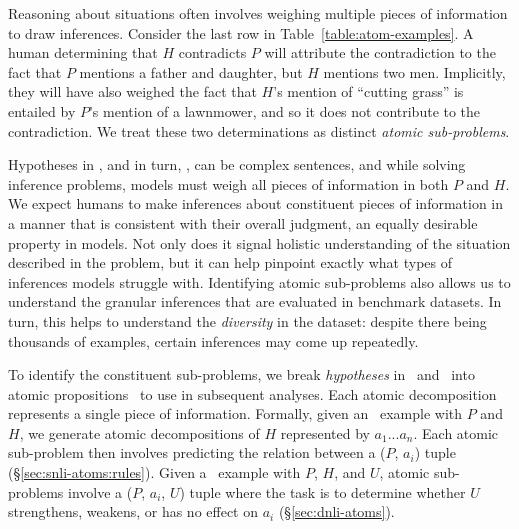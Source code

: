 

Reasoning about situations often involves weighing multiple pieces of information to draw inferences. 
%
Consider the last row in Table~\ref{table:atom-examples}. 
%
A human determining that $H$ contradicts $P$ will attribute the contradiction to the fact that $P$ mentions a father and daughter, but $H$ mentions two men.
%
Implicitly, they will have also weighed the fact that $H$'s mention of ``cutting grass'' is entailed by $P$'s mention of a lawnmower, and so it does not contribute to the contradiction.
%
We treat these two determinations as distinct \textit{atomic sub-problems}.


Hypotheses in \snli, and in turn, \dsnli, can be complex sentences, and while solving inference problems, models must weigh all pieces of information in both $P$ and $H$.
% 
We expect humans to make inferences about constituent pieces of information in a manner that is consistent with their overall judgment, an equally desirable property in models.
%
Not only does it signal holistic understanding of the situation described in the problem, but it can help pinpoint exactly what types of inferences models struggle with.
%
Identifying atomic sub-problems also allows us to understand the granular inferences that are evaluated in benchmark datasets.
%
In turn, this helps to understand the \textit{diversity} in the dataset: despite there being thousands of examples, certain inferences may come up repeatedly.

%
To identify the constituent sub-problems, we break \textit{hypotheses} in \snli~and \dsnli~into atomic propositions~\cite{wanner2024closer} to use in subsequent analyses. 
%
Each atomic decomposition represents a single piece of information.
%
Formally, given an \snli~example with $P$ and $H$, we generate atomic decompositions of $H$ represented by $a_1...a_n$. 
%
Each atomic sub-problem then involves predicting the relation between a ($P$, $a_i$) tuple (\S\ref{sec:snli-atoms:rules}).
%
Given a \dnli~example with $P$, $H$, and $U$, atomic sub-problems involve a ($P$, $a_i$, $U$) tuple where the task is to determine whether $U$ strengthens, weakens, or has no effect on $a_i$ (\S\ref{sec:dnli-atoms}).


